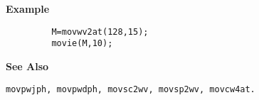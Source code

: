 {\bf \large {}\selectfont Example}
\begin{verbatim}
         M=movwv2at(128,15); 
         movie(M,10);
\end{verbatim}
\vspace*{.5cm}


{\bf \large {}\selectfont See Also}\\
\hspace*{1.5cm}
\begin{minipage}[t]{13.5cm}
\begin{verbatim}
movpwjph, movpwdph, movsc2wv, movsp2wv, movcw4at.
\end{verbatim}
\end{minipage}

